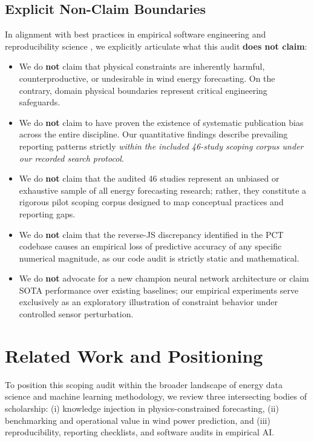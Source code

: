 \documentclass[preprint,3p,times]{elsarticle}
\begin{document}
\subsection{Explicit Non-Claim Boundaries}
In alignment with best practices in empirical software engineering and reproducibility science \cite{lipton2019,kapoor2023}, we explicitly articulate what this audit \textbf{does not claim}:
\begin{itemize}[leftmargin=2em]
    \item We do \textbf{not} claim that physical constraints are inherently harmful, counterproductive, or undesirable in wind energy forecasting. On the contrary, domain physical boundaries represent critical engineering safeguards.
    \item We do \textbf{not} claim to have proven the existence of systematic publication bias across the entire discipline. Our quantitative findings describe prevailing reporting patterns strictly \textit{within the included 46-study scoping corpus under our recorded search protocol}.
    \item We do \textbf{not} claim that the audited 46 studies represent an unbiased or exhaustive sample of all energy forecasting research; rather, they constitute a rigorous pilot scoping corpus designed to map conceptual practices and reporting gaps.
    \item We do \textbf{not} claim that the reverse-JS discrepancy identified in the PCT codebase causes an empirical loss of predictive accuracy of any specific numerical magnitude, as our code audit is strictly static and mathematical.
    \item We do \textbf{not} advocate for a new champion neural network architecture or claim SOTA performance over existing baselines; our empirical experiments serve exclusively as an exploratory illustration of constraint behavior under controlled sensor perturbation.
\end{itemize}

\section{Related Work and Positioning}
\label{sec:related_work}

To position this scoping audit within the broader landscape of energy data science and machine learning methodology, we review three intersecting bodies of scholarship: (i) knowledge injection in physics-constrained forecasting, (ii) benchmarking and operational value in wind power prediction, and (iii) reproducibility, reporting checklists, and software audits in empirical AI.
\end{document}
